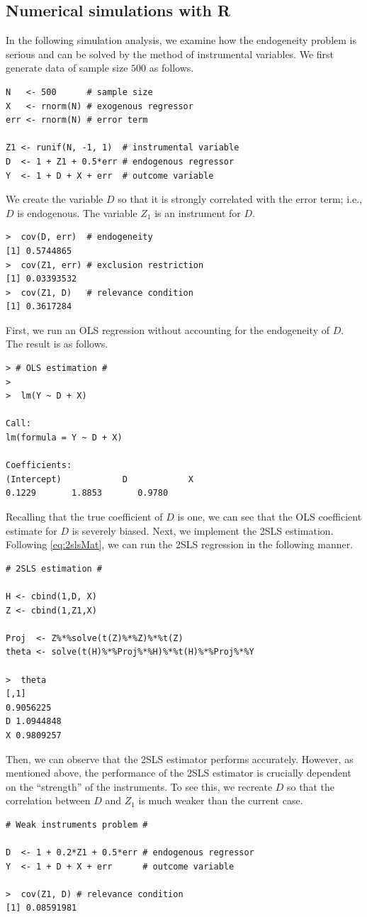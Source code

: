 \documentclass[10.5pt, A4paper, openany, uplatex]{book}
\numberwithin{equation}{section}
\begin{document}
\subsection{Numerical simulations with \textbf{R}}

In the following simulation analysis, we examine how the endogeneity problem is serious and can be solved by the method of instrumental variables.
We first generate data of sample size $500$ as follows.
\begin{lstlisting}[basicstyle=\ttfamily\footnotesize, frame=single]
N   <- 500      # sample size
X   <- rnorm(N) # exogenous regressor
err <- rnorm(N) # error term

Z1 <- runif(N, -1, 1)  # instrumental variable
D  <- 1 + Z1 + 0.5*err # endogenous regressor
Y  <- 1 + D + X + err  # outcome variable
\end{lstlisting}
We create the variable $D$ so that it is strongly correlated with the error term; i.e., $D$ is endogenous.
The variable $Z_1$ is an instrument for $D$.
\begin{lstlisting}[basicstyle=\ttfamily\footnotesize, frame=single]
>  cov(D, err)  # endogeneity
[1] 0.5744865
>  cov(Z1, err) # exclusion restriction
[1] 0.03393532
>  cov(Z1, D)   # relevance condition
[1] 0.3617284
\end{lstlisting}
First, we run an OLS regression without accounting for the endogeneity of $D$.
The result is as follows.
\begin{lstlisting}[basicstyle=\ttfamily\footnotesize, frame=single]
> # OLS estimation #
> 
>  lm(Y ~ D + X)

Call:
lm(formula = Y ~ D + X)

Coefficients:
(Intercept)            D            X  
0.1229       1.8853       0.9780  
\end{lstlisting}
Recalling that the true coefficient of $D$ is one, we can see that the OLS coefficient estimate for $D$ is severely biased.
Next, we implement the 2SLS estimation.
Following \eqref{eq:2slsMat}, we can run the 2SLS regression in the following manner. 
\begin{lstlisting}[basicstyle=\ttfamily\footnotesize, frame=single]
# 2SLS estimation #

H <- cbind(1,D, X)
Z <- cbind(1,Z1,X)

Proj  <- Z%*%solve(t(Z)%*%Z)%*%t(Z)
theta <- solve(t(H)%*%Proj%*%H)%*%t(H)%*%Proj%*%Y

>  theta
[,1]
0.9056225
D 1.0944848
X 0.9809257
\end{lstlisting}
Then, we can observe that the 2SLS estimator performs accurately.
However, as mentioned above, the performance of the 2SLS estimator is crucially dependent on the ``strength'' of the instruments.
To see this, we recreate $D$ so that the correlation between $D$ and $Z_1$ is much weaker than the current case.
\begin{lstlisting}[basicstyle=\ttfamily\footnotesize, frame=single]
# Weak instruments problem #

D  <- 1 + 0.2*Z1 + 0.5*err # endogenous regressor
Y  <- 1 + D + X + err      # outcome variable

>  cov(Z1, D) # relevance condition
[1] 0.08591981
\end{lstlisting}
\end{document}
